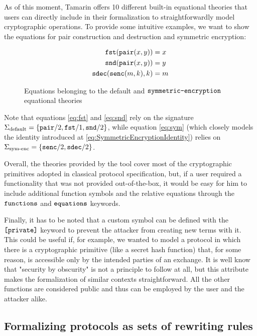 \documentclass{article}
\newcommand{\mono}[1]{\textrm{\tt #1}}
\begin{document}
As of this moment, Tamarin offers 10 different built-in equational theories that users can directly include in their formalization to straightforwardly model cryptographic operations. To provide some intuitive examples, we want to show the equations for pair construction and destruction and symmetric encryption:

\begin{figure}
    \begin{align}
        \mono{fst}(\mono{pair}(x,y)) &= x \label{eq:fst}\\
        \mono{snd}(\mono{pair}(x,y)) &= y \label{eq:snd}\\
        \mono{sdec}(\mono{senc}(m, k), k) &= m \label{eq:sym}
    \end{align}
    \caption{Equations belonging to the default and $\mono{symmetric-encryption}$ equational theories}
\end{figure}

Note that equations \ref{eq:fst} and \ref{eq:snd} rely on the signature $\Sigma_\textrm{default} = \{\mono{pair}/2, \mono{fst}/1, \mono{snd}/2\}$, while equation \ref{eq:sym} (which closely models the identity introduced at \ref{eq:SymmetricEncryptionIdentity}) relies on $\Sigma_\textrm{sym-enc} = \{\mono{senc}/2, \mono{sdec}/2\}$. 

Overall, the theories provided by the tool cover most of the cryptographic primitives adopted in classical protocol specification, but, if a user required a functionality that was not provided out-of-the-box, it would be easy for him to include additional function symbols and the relative equations through the $\mono{functions}$ and $\mono{equations}$ keywords.

Finally, it has to be noted that a custom symbol can be defined with the $\mono{[private]}$ keyword to prevent the attacker from creating new terms with it. This could be useful if, for example, we wanted to model a protocol in which there is a cryptographic primitive (like a secret hash function) that, for some reason, is accessible only by the intended parties of an exchange. It is well know that "security by obscurity" is not a principle to follow at all, but this attribute makes the formalization of similar contexts straightforward. All the other functions are considered public and thus can be employed by the user and the attacker alike.

\subsection{Formalizing protocols as sets of rewriting rules}
\end{document}
